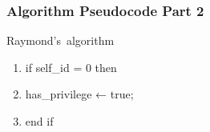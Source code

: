 \documentclass[11pt]{beamer}              %
\begin{document}
\begin{frame}
\frametitle{Algorithm Pseudocode Part 2}

\begin{center}
\begin{algorithm}[H]
	\scriptsize
	\def\algorithmlabel{Raymond's}
    \caption{\algorithmlabel\ algorithm}
    \label{alg:raymondsalgorithm}
    \begin{algorithmic}[1]
            \begin{enumerate}
                \item if self\_id = 0 then
                \item \quad has\_privilege ← true;
                \item end if
            \end{enumerate}
    \end{algorithmic}
\end{algorithm}
\end{center}
\end{frame}
\end{document}
